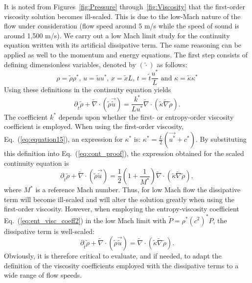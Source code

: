 \documentclass[12pt]{article}
\newcommand{\eqt}[1]{Eq.~(\ref{#1})} %
\begin{document}
It is noted from Figures~\ref{fig:Pressure} through~\ref{fig:Viscosity} that the first-order viscosity solution becomes ill-scaled. This is due to the low-Mach nature of the flow under consideration (flow speed around 5 m/s while the speed of sound is around 1,500 m/s). We carry out a low Mach limit study for the continuity equation written with its artificial dissipative term. The same reasoning can be applied as well to the momentum and energy equations. The first step consists of defining dimensionless variables, denoted by $(\tilde{\cdot})$ as follows:
\begin{equation}
\rho = \tilde{\rho} \rho^* \text{, } u = \tilde{u} u^* \text{, } x = \tilde{x} L \text{, } t = \tilde{t} \frac{u^*}{L} \text{ and } \kappa = \tilde{\kappa} \kappa^* 
\end{equation}
Using these definitions in the continuity equation yields
\begin{equation}
\label{eq:cont_proof}
\partial_{\tilde{t}} \tilde{\rho} + \tilde{\nabla} \cdot \left( \tilde{\rho} \vec{\tilde{u}} \right) =  \frac{k^*}{L u^*}  \tilde{\nabla}  \cdot  \left( \tilde{\kappa}  \tilde{\nabla} \tilde{\rho} \right).
\end{equation}
The coefficient $k^*$ depends upon whether the first- or entropy-order viscosity coefficient is employed. When using the first-order viscosity, \eqt{eq:equation15}, an expression for $\kappa^*$ is: $\kappa^* = \frac{L}{2}\left( \vec{u^*} + c^* \right)$. By substituting this definition into \eqt{eq:cont_proof}, the expression obtained for the scaled continuity equation is
\begin{equation}
\label{eq:cont_proof2}
\partial_{\tilde{t}} \tilde{\rho} + \tilde{\nabla} \cdot \left( \tilde{\rho} \vec{\tilde{u}} \right) = \frac{1}{2}\left( 1 + \frac{1}{M^*} \right)  \tilde{\nabla} \cdot \left(\tilde{\kappa}\tilde{\nabla} \tilde{\rho} \right),
\end{equation}
where $M^*$ is a reference Mach number. Thus, for low Mach flow the dissipative term will become ill-scaled and will alter the solution greatly
when using the first-order viscosity. However, when employing the entropy-viscosity coefficient \eqt{eq:ent_visc_coeff2} in the low Mach limit with 
$\tilde{P} = \rho^* (c^2)^* P$, the dissipative term is well-scaled:
\begin{equation}
\label{eq:cont_proof3}
\partial_{\tilde{t}} \tilde{\rho} + \tilde{\nabla} \cdot \left( \tilde{\rho} \vec{\tilde{u}} \right) =  \tilde{\nabla} \cdot  \left(\tilde{\kappa}\tilde{\nabla}  \tilde{\rho} \right).
\end{equation}
Obviously, it is therefore critical to evaluate, and if needed, to adapt the definition of the viscosity coefficients employed with the dissipative terms to a wide range of flow speeds.
\end{document}
